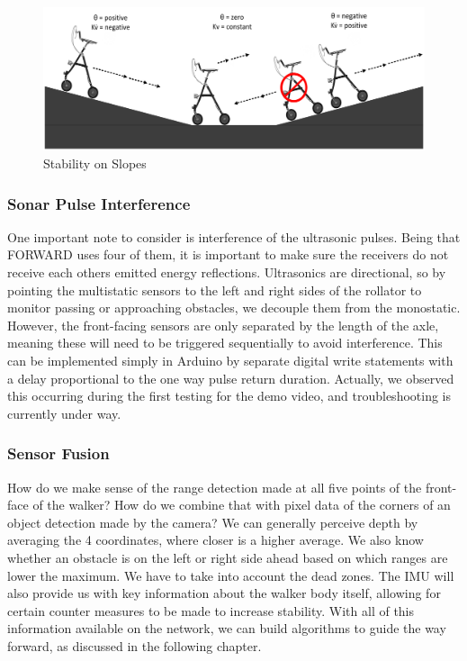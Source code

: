 \begin{figure}[H]
	\centering
	\includegraphics[width=\textwidth]{./Images/Incline-Decline-Stability.png}
	\caption{\label{fig:slope-stability}Stability on Slopes}
\end{figure}

\subsubsection{Sonar Pulse Interference}
\noindent One important note to consider is interference of the ultrasonic pulses. Being that FORWARD uses four of them, it is important to make sure the receivers do not receive each others emitted energy reflections. Ultrasonics are directional, so by pointing the multistatic sensors to the left and right sides of the rollator to monitor passing or approaching obstacles, we decouple them from the monostatic. However, the front-facing sensors are only separated by the length of the axle, meaning these will need to be triggered sequentially to avoid interference. This can be implemented simply in Arduino by separate digital write statements with a delay proportional to the one way pulse return duration. Actually, we observed this occurring during the first testing for the demo video, and troubleshooting is currently under way.\\

\subsubsection{Sensor Fusion}
\noindent How do we make sense of the range detection made at all five points of the front-face of the walker? How do we combine that with pixel data of the corners of an object detection made by the camera? We can generally perceive depth by averaging the 4 coordinates, where closer is a higher average. We also know whether an obstacle is on the left or right side ahead based on which ranges are lower the maximum. We have to take into account the dead zones. The IMU will also provide us with key information about the walker body itself, allowing for certain counter measures to be made to increase stability. With all of this information available on the network, we can build algorithms to guide the way forward, as discussed in the following chapter.\\

